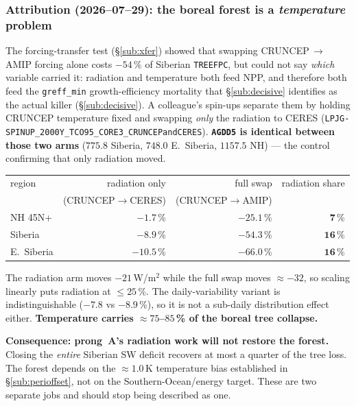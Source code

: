 \documentclass[10pt]{article}
\begin{document}
\subsubsection{Attribution (2026--07--29): the boreal forest is a \emph{temperature} problem}\label{sub:radvstemp}
The forcing-transfer test (\S\ref{sub:xfer}) showed that swapping CRUNCEP\,$\to$\,AMIP forcing alone costs
$-54$\,\% of Siberian \texttt{TREEFPC}, but could not say \emph{which} variable carried it: radiation and
temperature both feed NPP, and therefore both feed the \texttt{greff\_min} growth-efficiency mortality that
\S\ref{sub:decisive} identifies as the actual killer (\S\ref{sub:decisive}). A colleague's spin-ups separate them by holding CRUNCEP
temperature fixed and swapping \emph{only} the radiation to CERES
(\texttt{LPJG-SPINUP\_2000Y\_TCO95\_CORE3\_CRUNCEPandCERES}). \textbf{\texttt{AGDD5} is identical between
those two arms} ($775.8$ Siberia, $748.0$ E.\ Siberia, $1157.5$ NH) --- the control confirming that only
radiation moved.

\begin{center}
\begin{tabular}{lrrr}
\toprule
region & radiation only & full swap & radiation share \\
 & (CRUNCEP$\to$CERES) & (CRUNCEP$\to$AMIP) & \\
\midrule
NH 45N+     & $-1.7$\,\%  & $-25.1$\,\% & $\mathbf{7}$\,\% \\
Siberia     & $-8.9$\,\%  & $-54.3$\,\% & $\mathbf{16}$\,\% \\
E.\ Siberia & $-10.5$\,\% & $-66.0$\,\% & $\mathbf{16}$\,\% \\
\bottomrule
\end{tabular}
\end{center}

\noindent The radiation arm moves $-21$\,W/m$^2$ while the full swap moves $\approx-32$, so scaling linearly
puts radiation at $\le25$\,\%. The daily-variability variant is indistinguishable ($-7.8$ vs $-8.9$\,\%), so
it is not a sub-daily distribution effect either. \textbf{Temperature carries $\approx75$--$85$\,\% of the
boreal tree collapse.}

\textbf{Consequence: prong~A's radiation work will not restore the forest.} Closing the \emph{entire} Siberian
SW deficit recovers at most a quarter of the tree loss. The forest depends on the $\approx1.0$\,K temperature
bias established in \S\ref{sub:perioffset}, not on the Southern-Ocean/energy target. These are two separate
jobs and should stop being described as one.
\end{document}
